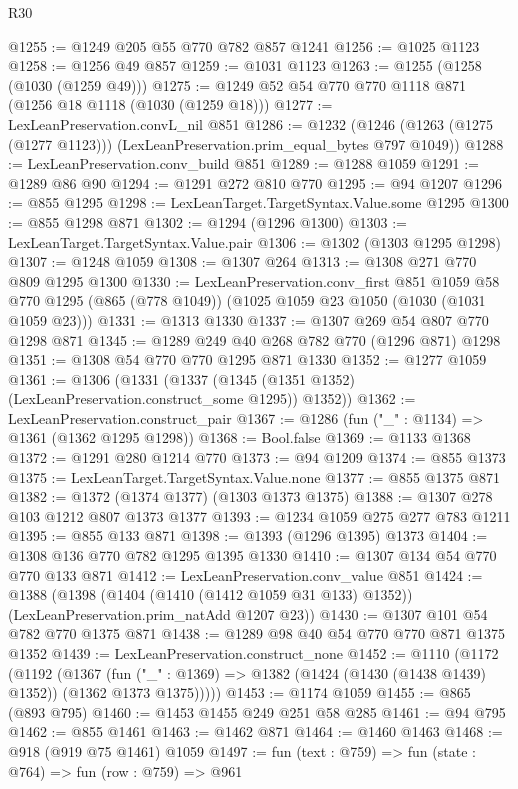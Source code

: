 \begin{lexlean}{R30}
\begin{coremodule}
@1255 := @1249 @205 @55 @770 @782 @857 @1241
@1256 := @1025 @1123
@1258 := @1256 @49 @857
@1259 := @1031 @1123
@1263 := @1255 (@1258 (@1030 (@1259 @49)))
@1275 := @1249 @52 @54 @770 @770 @1118 @871 (@1256 @18 @1118 (@1030 (@1259 @18)))
@1277 := LexLeanPreservation.convL_nil @851
@1286 := @1232
    (@1246 (@1263 (@1275 (@1277 @1123))) (LexLeanPreservation.prim_equal_bytes @797 @1049))
@1288 := LexLeanPreservation.conv_build @851
@1289 := @1288 @1059
@1291 := @1289 @86 @90
@1294 := @1291 @272 @810 @770
@1295 := @94 @1207
@1296 := @855 @1295
@1298 := LexLeanTarget.TargetSyntax.Value.some @1295
@1300 := @855 @1298 @871
@1302 := @1294 (@1296 @1300)
@1303 := LexLeanTarget.TargetSyntax.Value.pair
@1306 := @1302 (@1303 @1295 @1298)
@1307 := @1248 @1059
@1308 := @1307 @264
@1313 := @1308 @271 @770 @809 @1295 @1300
@1330 := LexLeanPreservation.conv_first
    @851
    @1059
    @58
    @770
    @1295
    (@865 (@778 @1049))
    (@1025 @1059 @23 @1050 (@1030 (@1031 @1059 @23)))
@1331 := @1313 @1330
@1337 := @1307 @269 @54 @807 @770 @1298 @871
@1345 := @1289 @249 @40 @268 @782 @770 (@1296 @871) @1298
@1351 := @1308 @54 @770 @770 @1295 @871 @1330
@1352 := @1277 @1059
@1361 := @1306
    (@1331 (@1337 (@1345 (@1351 @1352) (LexLeanPreservation.construct_some @1295)) @1352))
@1362 := LexLeanPreservation.construct_pair
@1367 := @1286 (fun ("_" : @1134) => @1361 (@1362 @1295 @1298))
@1368 := Bool.false
@1369 := @1133 @1368
@1372 := @1291 @280 @1214 @770
@1373 := @94 @1209
@1374 := @855 @1373
@1375 := LexLeanTarget.TargetSyntax.Value.none
@1377 := @855 @1375 @871
@1382 := @1372 (@1374 @1377) (@1303 @1373 @1375)
@1388 := @1307 @278 @103 @1212 @807 @1373 @1377
@1393 := @1234 @1059 @275 @277 @783 @1211
@1395 := @855 @133 @871
@1398 := @1393 (@1296 @1395) @1373
@1404 := @1308 @136 @770 @782 @1295 @1395 @1330
@1410 := @1307 @134 @54 @770 @770 @133 @871
@1412 := LexLeanPreservation.conv_value @851
@1424 := @1388
    (@1398 (@1404 (@1410 (@1412 @1059 @31 @133) @1352)) (LexLeanPreservation.prim_natAdd @1207 @23))
@1430 := @1307 @101 @54 @782 @770 @1375 @871
@1438 := @1289 @98 @40 @54 @770 @770 @871 @1375 @1352
@1439 := LexLeanPreservation.construct_none
@1452 := @1110
    (@1172
      (@1192
        (@1367
          (fun ("_" : @1369) => @1382 (@1424 (@1430 (@1438 @1439) @1352)) (@1362 @1373 @1375)))))
@1453 := @1174 @1059
@1455 := @865 (@893 @795)
@1460 := @1453 @1455 @249 @251 @58 @285
@1461 := @94 @795
@1462 := @855 @1461
@1463 := @1462 @871
@1464 := @1460 @1463
@1468 := @918 (@919 @75 @1461) @1059
@1497 := fun (text : @759) =>
  fun (state : @764) =>
  fun (row : @759) =>
  @961

\end{coremodule}
\end{lexlean}

